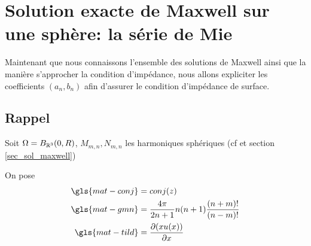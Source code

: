 \section{Solution exacte de Maxwell sur une sphère: la série de Mie}\label{sec_serie_mie}


Maintenant que nous connaissons l'ensemble des solutions de Maxwell ainsi que la manière s'approcher la condition d'impédance, nous allons expliciter les coefficients $(a_n,b_n)$  afin d'assurer le condition d'impédance de surface.


\subsection{Rappel}
Soit $\Omega = B_{\mathbb R^3}(0,R)$, $M_{m,n}, N_{m,n}$ les harmoniques sphériques (cf \cite{marceaux_high-order_2000} et section \ref{sec_sol_maxwell})


On pose
\begin{align*}
  \gls{mat-conj} &=conj(z)\\
  \gls{mat-gmn} &=\frac{4\pi}{2n+1}n(n+1)\frac{(n+m)!}{(n-m)!}\\
  \gls{mat-tild} &= \dr{x}{(xu(x))}
\end{align*}

